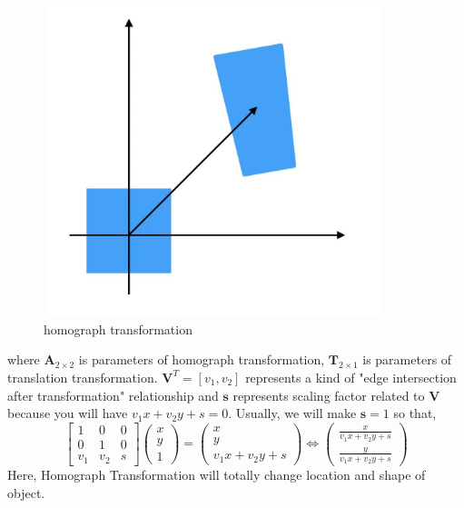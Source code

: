 \documentclass[12pt, a4 paper]{article}
\begin{document}
\begin{figure}[h]
    \centering
    \includegraphics[width=10cm,height=9cm]{homograph transformation.jpg}
    \caption{homograph transformation}
\end{figure}

\indent where $\boldsymbol{A}_{2\times 2}$ is parameters of homograph
transformation, $\boldsymbol{T}_{2\times 1}$ is parameters of
translation transformation. $\boldsymbol{V}^{T} = [v_{1}, v_{2}]$
represents a kind of "edge intersection after transformation" 
relationship and $\boldsymbol{s}$ represents scaling factor related to
$\boldsymbol{V}$ because you will have $v_{1}x+v_{2}y + s = 0$.
Usually, we will make $\boldsymbol{s}=1$ so that,
\begin{equation}
    \begin{bmatrix}
        1 & 0 & 0\\ 0 &1 &0 \\ v_{1} & v_{2} & s
    \end{bmatrix} 
    \begin{pmatrix}
        x \\ y \\ 1
    \end{pmatrix} = 
    \begin{pmatrix}
        x \\ y \\ v_{1}x + v_{2}y + s
    \end{pmatrix}
    \iff
    \begin{pmatrix}
        \frac{x}{v_{1}x + v_{2}y + s} \\
        \frac{y}{v_{1}x + v_{2}y + s}
    \end{pmatrix}
\end{equation}
\indent Here, Homograph Transformation will totally change 
location and shape of object.
\end{document}
